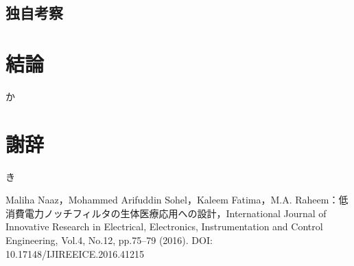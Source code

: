 \documentclass[11pt,dvipdfmx]{jarticle}
\begin{document}
\subsection{独自考察}

\section{結論}
か

\section{謝辞}
き


\begin{thebibliography}{99}
 Maliha Naaz，Mohammed Arifuddin Sohel，Kaleem Fatima，M.A. Raheem：低消費電力ノッチフィルタの生体医療応用への設計，International Journal of Innovative Research in Electrical, Electronics, Instrumentation and Control Engineering, Vol.4, No.12, pp.75–79 (2016). DOI: 10.17148/IJIREEICE.2016.41215
\end{thebibliography}
\end{document}
